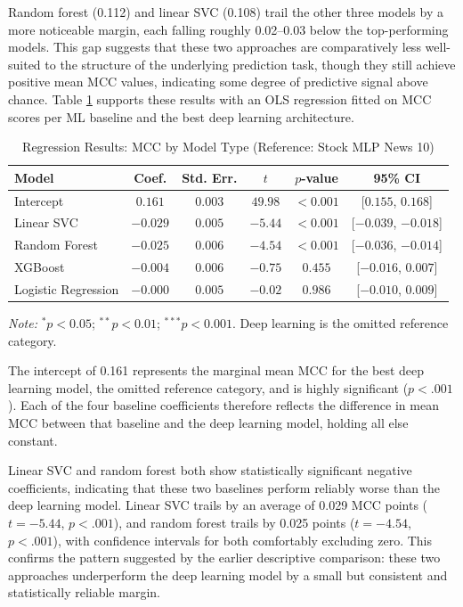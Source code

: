 \documentclass[stu,floatsintext]{apa7}
\begin{document}
Random forest (0.112) and linear SVC (0.108) trail the other three models by a more noticeable margin, each falling roughly 0.02--0.03 below the top-performing models. This gap suggests that these two approaches are comparatively less well-suited to the structure of the underlying prediction task, though they still achieve positive mean MCC values, indicating some degree of predictive signal above chance. Table \ref{tab:mcc_baseline_regression} supports these results with an OLS regression fitted on MCC scores per ML baseline and the best deep learning architecture.

\begin{table}[htbp]
\centering
\caption{Regression Results: MCC by Model Type (Reference: Stock MLP News 10)}
\label{tab:mcc_baseline_regression}
\begin{tabular}{lccccc}
\toprule
Model & Coef. & Std. Err. & $t$ & $p$-value & 95\% CI \\
\midrule
Intercept              & $0.161$  & $0.003$ & $49.98$ & $<0.001$\rlap{$^{***}$} & [$0.155$, $0.168$] \\
Linear SVC              & $-0.029$ & $0.005$ & $-5.44$ & $<0.001$\rlap{$^{***}$} & [$-0.039$, $-0.018$] \\
Random Forest            & $-0.025$ & $0.006$ & $-4.54$ & $<0.001$\rlap{$^{***}$} & [$-0.036$, $-0.014$] \\
XGBoost                  & $-0.004$ & $0.006$ & $-0.75$ & $0.455$                & [$-0.016$, $0.007$] \\
Logistic Regression      & $-0.000$ & $0.005$ & $-0.02$ & $0.986$                & [$-0.010$, $0.009$] \\
\bottomrule
\end{tabular}
\begin{flushleft}
\footnotesize
\textit{Note:} $^{*}p<0.05$; $^{**}p<0.01$; $^{***}p<0.001$. Deep learning is the omitted reference category.
\end{flushleft}
\end{table}

The intercept of 0.161 represents the marginal mean MCC for the best deep learning model, the omitted reference category, and is highly significant ($p < .001$). Each of the four baseline coefficients therefore reflects the difference in mean MCC between that baseline and the deep learning model, holding all else constant.

Linear SVC and random forest both show statistically significant negative coefficients, indicating that these two baselines perform reliably worse than the deep learning model. Linear SVC trails by an average of 0.029 MCC points ($t = -5.44$, $p < .001$), and random forest trails by 0.025 points ($t = -4.54$, $p < .001$), with confidence intervals for both comfortably excluding zero. This confirms the pattern suggested by the earlier descriptive comparison: these two approaches underperform the deep learning model by a small but consistent and statistically reliable margin.
\end{document}
